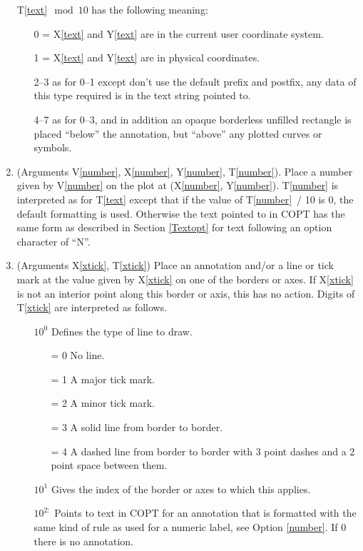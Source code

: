 \documentclass[twoside]{MATH77}
\begin{document}
\begin{multicols}{2}
\begin{enumerate}
        T\ref{text}$\mod 10$ has the following meaning:
        \begin{itemize}
        \item[0 =] X\ref{text} and  Y\ref{text} are in the current user
           coordinate system.
        \item[1 =] X\ref{text} and  Y\ref{text} are in physical
          coordinates.
        \item[2--3] as for 0--1 except don't use the default prefix and
          postfix, any data of this type required is in the text string
          pointed to.
        \item[4--7] as for 0--3, and in addition an opaque borderless
        unfilled rectangle is placed ``below'' the annotation, but
        ``above'' any plotted curves or symbols.
        \end{itemize}

\item\label{number} (Arguments V\ref{number}, X\ref{number},
        Y\ref{number}, T\ref{number}).  Place a number given by
        V\ref{number} on the plot at (X\ref{number}, Y\ref{number}).
        T\ref{number} is interpreted as for T\ref{text} except that
        if the value of T\ref{number}~/ 10 is 0, the default formatting
        is used.  Otherwise the text pointed to in COPT has the same
        form as described in Section \ref{Textopt} for text following an
        option character of ``N''.

\item\label{xtick} (Arguments X\ref{xtick}, T\ref{xtick})
        Place an annotation and/or a line or tick mark at the
        value given by X\ref{xtick} on one of the borders or axes.  If
        X\ref{xtick} is not an interior point along this border or axis,
        this has no action.  Digits of T\ref{xtick} are interpreted as
        follows.
        \begin{itemize}
        \item[$10^0$] Defines the type of line to draw.
        \begin{itemize}
        \item[= 0] No line.
        \item[= 1] A major tick mark.
        \item[= 2] A minor tick mark.
        \item[= 3] A solid line from border to border.
        \item[= 4] A dashed line from border to border with 3 point dashes
                   and a 2 point space between them.
        \end{itemize}
        \item[$10^1$] Gives the index of the border or axes to which this
                     applies.
        \item[$10^{2:}$] Points to text in COPT for an annotation that is
            formatted with the same kind of rule as used for a numeric
            label, see Option \ref{number}. If 0 there is no annotation.
        \end{itemize}


\end{enumerate}
\end{multicols}
\end{document}
